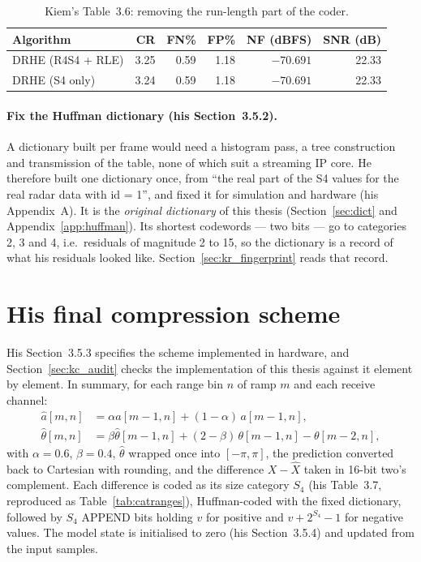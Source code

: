 \begin{table}[htbp]
\centering
\caption[Kiem: DRHE without run-length coding]{Kiem's Table~3.6: removing the
run-length part of the coder.}
\label{tab:kc_t36}
\small
\begin{tabular}{@{}lrrrrr@{}}
\toprule
Algorithm & CR & FN\% & FP\% & NF (dBFS) & SNR (dB)\\
\midrule
DRHE (R4S4 + RLE) & 3.25 & 0.59 & 1.18 & $-70.691$ & 22.33\\
DRHE (S4 only)    & 3.24 & 0.59 & 1.18 & $-70.691$ & 22.33\\
\bottomrule
\end{tabular}
\end{table}

\paragraph{Fix the Huffman dictionary (his Section~3.5.2).} A dictionary built
per frame would need a histogram pass, a tree construction and transmission of
the table, none of which suit a streaming IP core. He therefore built one
dictionary once, from ``the real part of the S4 values for the real radar data
with id = 1'', and fixed it for simulation and hardware (his Appendix~A). It is
the \emph{original dictionary} of this thesis
(Section~\ref{sec:dict} and Appendix~\ref{app:huffman}). Its shortest
codewords --- two bits --- go to categories 2, 3 and 4, i.e.\ residuals of
magnitude 2 to 15, so the dictionary is a record of what his residuals looked
like. Section~\ref{sec:kr_fingerprint} reads that record.

\section{His final compression scheme}
\label{sec:kc_final}

His Section~3.5.3 specifies the scheme implemented in hardware, and
Section~\ref{sec:kc_audit} checks the implementation of this thesis against it
element by element. In summary, for each range bin $n$ of ramp $m$ and each
receive channel:
\begin{align}
\hat{a}[m,n] &= \alpha\hat{a}[m-1,n] + (1-\alpha)\,a[m-1,n],
\label{eq:kc_mag}\\
\hat{\theta}[m,n] &= \beta\hat{\theta}[m-1,n] + (2-\beta)\,\theta[m-1,n] - \theta[m-2,n],
\label{eq:kc_phase}
\end{align}
with $\alpha = 0.6$, $\beta = 0.4$, $\hat\theta$ wrapped once into
$[-\pi,\pi]$, the prediction converted back to Cartesian with rounding, and the
difference $X - \hat{X}$ taken in 16-bit two's complement. Each difference is
coded as its size category $S_4$ (his Table~3.7, reproduced as
Table~\ref{tab:catranges}), Huffman-coded with the fixed dictionary, followed by
$S_4$ APPEND bits holding $v$ for positive and $v + 2^{S_4} - 1$ for negative
values. The model state is initialised to zero (his Section~3.5.4) and updated
from the input samples.

